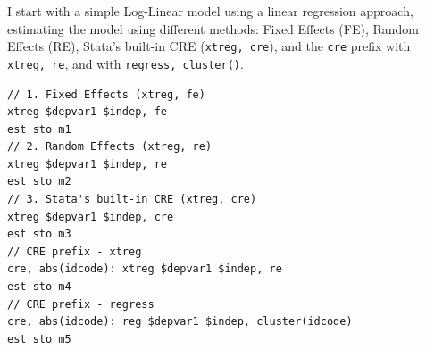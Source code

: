 \documentclass[bib]{statapress}
\begin{document}
I start with a simple Log-Linear model using a linear regression
approach, estimating the model using different methods: Fixed Effects
(FE), Random Effects (RE), Stata's built-in CRE (\texttt{xtreg,\ cre}),
and the \texttt{cre} prefix with \texttt{xtreg,\ re}, and with
\texttt{regress,\ cluster()}.

\begin{verbatim}
// 1. Fixed Effects (xtreg, fe)
xtreg $depvar1 $indep, fe  
est sto m1
// 2. Random Effects (xtreg, re)
xtreg $depvar1 $indep, re  
est sto m2
// 3. Stata's built-in CRE (xtreg, cre)
xtreg $depvar1 $indep, cre
est sto m3
// CRE prefix - xtreg
cre, abs(idcode): xtreg $depvar1 $indep, re  
est sto m4
// CRE prefix - regress
cre, abs(idcode): reg $depvar1 $indep, cluster(idcode)  
est sto m5
\end{verbatim}
\end{document}
